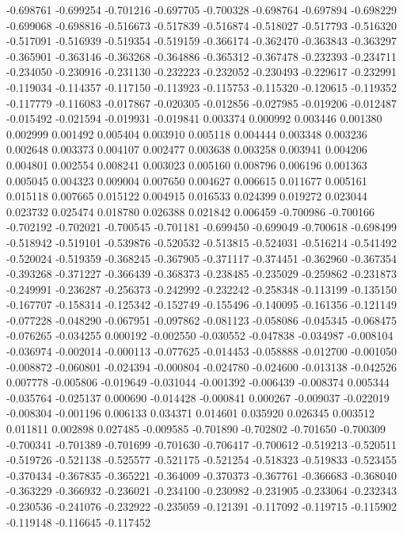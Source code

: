 -0.698761
-0.699254
-0.701216
-0.697705
-0.700328
-0.698764
-0.697894
-0.698229
-0.699068
-0.698816
-0.516673
-0.517839
-0.516874
-0.518027
-0.517793
-0.516320
-0.517091
-0.516939
-0.519354
-0.519159
-0.366174
-0.362470
-0.363843
-0.363297
-0.365901
-0.363146
-0.363268
-0.364886
-0.365312
-0.367478
-0.232393
-0.234711
-0.234050
-0.230916
-0.231130
-0.232223
-0.232052
-0.230493
-0.229617
-0.232991
-0.119034
-0.114357
-0.117150
-0.113923
-0.115753
-0.115320
-0.120615
-0.119352
-0.117779
-0.116083
-0.017867
-0.020305
-0.012856
-0.027985
-0.019206
-0.012487
-0.015492
-0.021594
-0.019931
-0.019841
0.003374
0.000992
0.003446
0.001380
0.002999
0.001492
0.005404
0.003910
0.005118
0.004444
0.003348
0.003236
0.002648
0.003373
0.004107
0.002477
0.003638
0.003258
0.003941
0.004206
0.004801
0.002554
0.008241
0.003023
0.005160
0.008796
0.006196
0.001363
0.005045
0.004323
0.009004
0.007650
0.004627
0.006615
0.011677
0.005161
0.015118
0.007665
0.015122
0.004915
0.016533
0.024399
0.019272
0.023044
0.023732
0.025474
0.018780
0.026388
0.021842
0.006459
-0.700986
-0.700166
-0.702192
-0.702021
-0.700545
-0.701181
-0.699450
-0.699049
-0.700618
-0.698499
-0.518942
-0.519101
-0.539876
-0.520532
-0.513815
-0.524031
-0.516214
-0.541492
-0.520024
-0.519359
-0.368245
-0.367905
-0.371117
-0.374451
-0.362960
-0.367354
-0.393268
-0.371227
-0.366439
-0.368373
-0.238485
-0.235029
-0.259862
-0.231873
-0.249991
-0.236287
-0.256373
-0.242992
-0.232242
-0.258348
-0.113199
-0.135150
-0.167707
-0.158314
-0.125342
-0.152749
-0.155496
-0.140095
-0.161356
-0.121149
-0.077228
-0.048290
-0.067951
-0.097862
-0.081123
-0.058086
-0.045345
-0.068475
-0.076265
-0.034255
0.000192
-0.002550
-0.030552
-0.047838
-0.034987
-0.008104
-0.036974
-0.002014
-0.000113
-0.077625
-0.014453
-0.058888
-0.012700
-0.001050
-0.008872
-0.060801
-0.024394
-0.000804
-0.024780
-0.024600
-0.013138
-0.042526
0.007778
-0.005806
-0.019649
-0.031044
-0.001392
-0.006439
-0.008374
0.005344
-0.035764
-0.025137
0.000690
-0.014428
-0.000841
0.000267
-0.009037
-0.022019
-0.008304
-0.001196
0.006133
0.034371
0.014601
0.035920
0.026345
0.003512
0.011811
0.002898
0.027485
-0.009585
-0.701890
-0.702802
-0.701650
-0.700309
-0.700341
-0.701389
-0.701699
-0.701630
-0.706417
-0.700612
-0.519213
-0.520511
-0.519726
-0.521138
-0.525577
-0.521175
-0.521254
-0.518323
-0.519833
-0.523455
-0.370434
-0.367835
-0.365221
-0.364009
-0.370373
-0.367761
-0.366683
-0.368040
-0.363229
-0.366932
-0.236021
-0.234100
-0.230982
-0.231905
-0.233064
-0.232343
-0.230536
-0.241076
-0.232922
-0.235059
-0.121391
-0.117092
-0.119715
-0.115902
-0.119148
-0.116645
-0.117452

